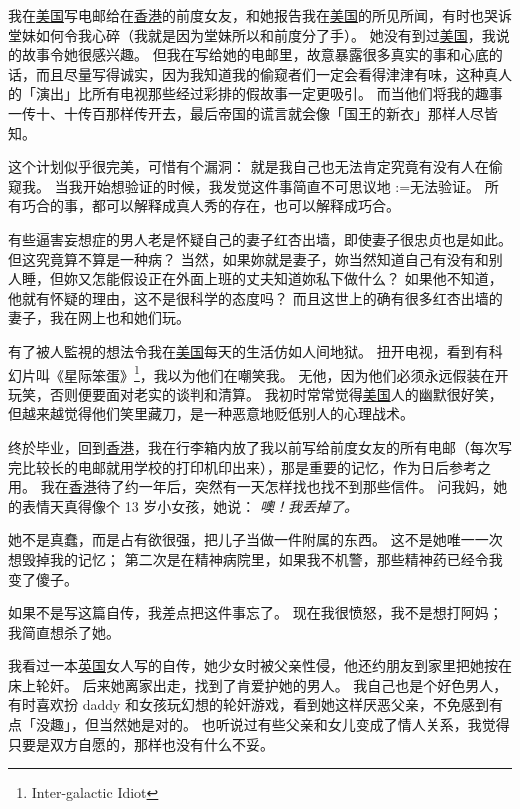 \documentclass[12pt]{report}
\makeatletter
\newcommand{\speechCn}[1]{\textrm{\textit{\textcolor{Speech}{#1}}}}
\renewcommand{\d}[1]{$\underaccent{\scalebox{0.5}{\textbullet}}{\textrm{#1}}$}
\newcommand{\ds}[1]{%
  \@tfor\next:=#1\do{\d{\next}}}
\makeatother
\begin{document}
{我在\uline{美国}写电邮给在\uline{香港}的前度女友，和她报告我在\uline{美国}的所见所闻，有时也哭诉堂妹如何令我心碎（我就是因为堂妹所以和前度分了手）。  她没有到过\uline{美国}，我说的故事令她很感兴趣。  但我在写给她的电邮里，故意暴露很多真实的事和心底的话，而且尽量写得诚实，因为我知道我的偷窥者们一定会看得津津有味，这种真人的「演出」比所有电视那些经过彩排的假故事一定更吸引。  而当他们将我的趣事一传十、十传百那样传开去，最后帝国的谎言就会像「国王的新衣」那样人尽皆知。

这个计划似乎很完美，可惜有个漏洞： 就是我自己也无法肯定究竟有没有人在偷窥我。 当我开始想验证的时候，我发觉这件事简直不可思议地\ds{无法验证}。  所有巧合的事，都可以解释成真人秀的存在，也可以解释成巧合。

有些逼害妄想症的男人老是怀疑自己的妻子红杏出墙，即使妻子很忠贞也是如此。 但这究竟算不算是一种病？ 当然，如果妳就是妻子，妳当然知道自己有没有和别人睡，但妳又怎能假设正在外面上班的丈夫知道妳私下做什么？  如果他不知道，他就有怀疑的理由，这不是很科学的态度吗？  而且这世上的确有很多红杏出墙的妻子，我在网上也和她们玩。

有了被人監視的想法令我在\uline{美国}每天的生活仿如人间地狱。  扭开电视，看到有科幻片叫《星际笨蛋》\footnote{Inter-galactic Idiot}，我以为他们在嘲笑我。  无他，因为他们必须永远假装在开玩笑，否则便要面对老实的谈判和清算。 我初时常常觉得\uline{美国}人的幽默很好笑，但越来越觉得他们笑里藏刀，是一种恶意地贬低别人的心理战术。

终於毕业，回到\uline{香港}，我在行李箱内放了我以前写给前度女友的所有电邮（每次写完比较长的电邮就用学校的打印机印出来），那是重要的记忆，作为日后参考之用。 我在\uline{香港}待了约一年后，突然有一天怎样找也找不到那些信件。 问我妈，她的表情天真得像个 13 岁小女孩，她说： \speechCn{噢！我丢掉了。}

她不是真蠢，而是占有欲很强，把儿子当做一件附属的东西。  这不是她唯一一次想毁掉我的记忆； 第二次是在精神病院里，如果我不机警，那些精神药已经令我变了傻子。

如果不是写这篇自传，我差点把这件事忘了。  现在我很愤怒，我不是想打阿妈； 我简直想杀了她。 

我看过一本\uline{英国}女人写的自传，她少女时被父亲性侵，他还约朋友到家里把她按在床上轮奸。 后来她离家出走，找到了肯爱护她的男人。 我自己也是个好色男人，有时喜欢扮 daddy 和女孩玩幻想的轮奸游戏，看到她这样厌恶父亲，不免感到有点「没趣」，但当然她是对的。  也听说过有些父亲和女儿变成了情人关系，我觉得只要是双方自愿的，那样也没有什么不妥。

}
\end{document}
